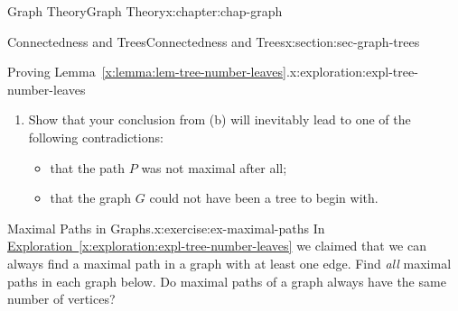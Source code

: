 \documentclass[oneside,10pt,]{book}
\newcommand{\xreffont}{\relax}
\numberwithin{equation}{section}
\begin{document}
\begin{chapterptx}{Graph Theory}{}{Graph Theory}{}{}{x:chapter:chap-graph}
\begin{sectionptx}{Connectedness and Trees}{}{Connectedness and Trees}{}{}{x:section:sec-graph-trees}
\begin{exploration}{Proving Lemma~{\xreffont\ref*{x:lemma:lem-tree-number-leaves}}.}{x:exploration:expl-tree-number-leaves}
\begin{enumerate}[font=\bfseries,label=(\alph*),ref=\alph*]
\begin{sidebyside}{1}{0.3}{0.3}{0}
\begin{sbspanel}{0.4}%
%
\end{sbspanel}%
\end{sidebyside}%
\par
Given the assumption that \(G\) has fewer than two leaves, what can we conclude about \(x_1\) and \(x_k\)? (Hint: what about their degrees?)%
\item{}Show that your conclusion from (b) will inevitably lead to one of the following contradictions:%
\begin{itemize}[label=\textbullet]
\item{}that the path \(P\) was not maximal after all;%
\item{}that the graph \(G\) could not have been a tree to begin with.%
\end{itemize}
%
\end{enumerate}
\end{exploration}
\begin{inlineexercise}{Maximal Paths in Graphs.}{x:exercise:ex-maximal-paths}%
In \hyperref[x:exploration:expl-tree-number-leaves]{Exploration~{\xreffont\ref{x:exploration:expl-tree-number-leaves}}} we claimed that we can always find a maximal path in a graph with at least one edge. Find \emph{all} maximal paths in each graph below. Do maximal paths of a graph always have the same number of vertices?%
\begin{sidebyside}{4}{0.045}{0.045}{0.09}%

\end{sidebyside}
\end{inlineexercise}
\end{sectionptx}
\end{chapterptx}
\end{document}
